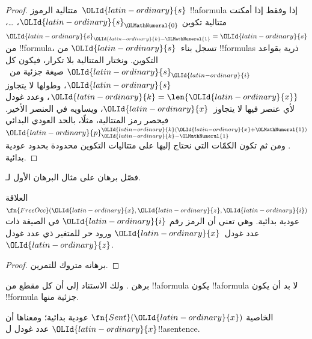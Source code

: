 \documentclass[../../../include/open-logic-section]{subfiles}
\begin{document}
\begin{proof}
متتالية الرموز~$\OLId{latin-ordinary}{s}$ !!a{formula} إذا وفقط إذا
أمكنت متتالية تكوين $\OLId{latin-ordinary}{s}_\OLMathNumeral{0}$، \dots،
$\OLId{latin-ordinary}{s}_{\OLId{latin-ordinary}{k}-\OLMathNumeral{1}}=\OLId{latin-ordinary}{s}$ من !!{formula}، تسجل
بناء~$\OLId{latin-ordinary}{s}$ من !!{formula}s ذرية بقواعد
التكوين. ونختار المتتالية بلا تكرار،
فيكون كل $\OLId{latin-ordinary}{s}_\OLId{latin-ordinary}{i}$ صيغة جزئية من~$\OLId{latin-ordinary}{s}$،
وطولها لا يتجاوز $\OLId{latin-ordinary}{k}=\len{\OLId{latin-ordinary}{x}}$،
وعدد غودل لأي عنصر فيها لا يتجاوز~$\OLId{latin-ordinary}{x}$،
ويساويه في العنصر الأخير. فيحصر رمز
المتتالية، مثلًا، بالحد العودي البدائي
$\OLId{latin-ordinary}{p}_{\OLId{latin-ordinary}{k}-\OLMathNumeral{1}}^{\OLId{latin-ordinary}{k}(\OLId{latin-ordinary}{x}+\OLMathNumeral{1})}$. ومن ثم تكون
الكمّات التي نحتاج إليها على متتاليات
التكوين محدودة بحدود عودية بدائية.
\end{proof}

\begin{prob}
فصّل برهان  على مثال
البرهان الأول لـ.
\end{prob}

\begin{prop}
العلاقة $\fn{FreeOcc}(\OLId{latin-ordinary}{x},\OLId{latin-ordinary}{z},\OLId{latin-ordinary}{i})$ عودية بدائية. وهي تعني
أن الرمز رقم $\OLId{latin-ordinary}{i}$ في الصيغة ذات عدد غودل~$\OLId{latin-ordinary}{x}$
ورود حر للمتغير ذي عدد غودل~$\OLId{latin-ordinary}{z}$.
\end{prop}

\begin{proof}
برهانه متروك للتمرين.
\end{proof}

\begin{prob}
برهن . ولك الاستناد إلى أن كل مقطع من !!a{formula} يكون !!a{formula} لا بد أن يكون
!!{formula} جزئية منها.
\end{prob}

\begin{prop}
الخاصية $\fn{Sent}(\OLId{latin-ordinary}{x})$ عودية بدائية؛ ومعناها أن $\OLId{latin-ordinary}{x}$
عدد غودل ل!!a{sentence}.
\end{prop}
\end{document}
